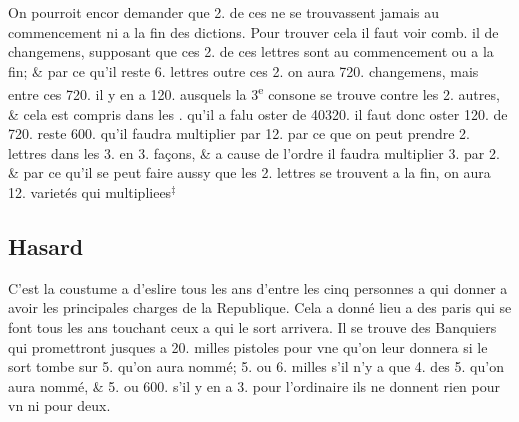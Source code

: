 \documentclass[11pt,a4paper]{article}
\begin{document}
On pourroit encor demander que 2. de ces  ne se trouvassent jamais au commencement ni a la fin des dictions. Pour trouver cela il faut voir comb. il  \struck{\ill{}} de changemens, supposant que ces 2. de ces lettres sont au commencement ou a la fin; \& par ce qu'il reste 6. lettres outre ces 2. on aura 720. changemens, mais entre ces 720. il y en  a 120. ausquels la 3\textsuperscript{e} consone se trouve contre les 2. autres, \& cela  est compris dans les . qu'il a falu oster de 40320. il faut donc oster 120. de 720. reste 600. qu'il faudra multiplier par 12. par ce que on peut prendre  2. lettres dans les 3. en 3. façons, \& a cause de l'ordre il faudra multiplier 3. par 2. \& par ce qu'il se peut faire aussy que les 2. lettres se trouvent a la fin, on aura 12. varietés qui multipliees${}^{\ddagger}$


\subsection*{Hasard}

C'est la coustume a  d'eslire  tous les ans d'entre les \ill{} cinq personnes a qui  donner a avoir les principales charges  de la Republique. Cela a donné lieu a des paris qui se font tous les ans touchant ceux a qui le sort arrivera. Il se trouve des Banquiers qui promettront jusques a 20. milles pistoles pour vne qu'on leur donnera si le sort tombe sur 5. qu'on aura nommé; \struck{\ill{}} 5. ou 6. milles s'il n'y a que 4. des 5. qu'on aura nommé, \& 5. ou 600.  s'il y en a 3. \struck{\ill{}} pour l'ordinaire ils ne donnent rien pour vn ni pour deux.
\end{document}
